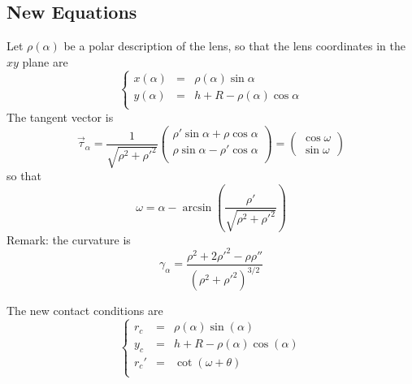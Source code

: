 \documentclass[aps,onecolumn]{revtex4}
\begin{document}
\subsection{New Equations}
Let $\rho(\alpha)$ be a polar description of the lens, so that the lens coordinates in the $xy$ plane are
\begin{equation}
	\left\lbrace
	\begin{array}{rcl}
	x(\alpha) & = & \rho(\alpha)\sin\alpha\\
	y(\alpha) & = & h + R - \rho(\alpha)\cos\alpha\\
	\end{array}
	\right.
\end{equation}
The   tangent vector is
\begin{equation}
	\vec{\tau}_\alpha = 
	\dfrac{1}{\sqrt{\rho^2+\rho'^2}}
	\begin{pmatrix}
		\rho'\sin\alpha+\rho\cos\alpha\\
		\rho\sin\alpha - \rho'\cos\alpha\\
	\end{pmatrix}
 = 
 	\begin{pmatrix}
	\cos\omega\\
	\sin\omega
	\end{pmatrix}
\end{equation}
so that
\begin{equation}
	\omega = \alpha - \arcsin\left(\dfrac{\rho'}{\sqrt{\rho^2+\rho'^2}}\right)
\end{equation}
Remark: the curvature is
\begin{equation}
	\gamma_\alpha = \dfrac{\rho^2 + 2\rho'^2 - \rho\rho''}{\left(\rho^2+\rho'^2\right)^{3/2}}
\end{equation}

The new contact conditions are
\begin{equation}
	\left\lbrace
		\begin{array}{rcl}
		r_c & = & \rho(\alpha)\sin(\alpha)\\
		y_c & = & h + R - \rho(\alpha)\cos(\alpha)\\
		r_c' & = & \cot\left(\omega+\theta\right)\\
		\end{array}
	\right.
\end{equation}
\end{document}
